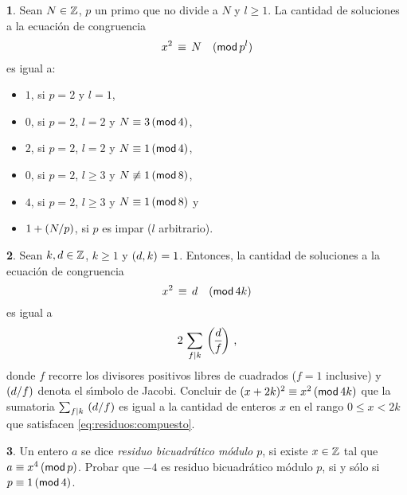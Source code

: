 \theoremstyle{definition}
\newtheorem{ejerResiduos}{\ejername}[section]


\begin{ejerResiduos}\label{ejer:residuos:potencia}
	Sean $N\in\Enteros$, $p$ un primo que no divide a $N$ y $l\geq 1$.
	La cantidad de soluciones a la ecuaci\'on de congruencia
	\begin{equation}
		\label{eq:ejer:residuos:potencia}
		x^2\,\equiv\,N\modulo[p^l]
	\end{equation}
	es igual a:
	\begin{itemize}
		\item $1$, si $p=2$ y $l=1$,
		\item $0$, si $p=2$, $l=2$ y $N\equiv 3\tmodulo[4]$,
		\item $2$, si $p=2$, $l=2$ y $N\equiv 1\tmodulo[4]$,
		\item $0$, si $p=2$, $l\geq 3$ y $N\not\equiv 1\tmodulo[8]$,
		\item $4$, si $p=2$, $l\geq 3$ y $N\equiv 1\tmodulo[8]$ y
		\item $1+\tlegendre N{p}$, si $p$ es impar ($l$ arbitrario).
	\end{itemize}
\end{ejerResiduos}

\begin{ejerResiduos}\label{ejer:residuos:compuesto}
	Sean $k,d\in\Enteros$, $k\geq 1$ y $\mcd{d,k}=1$. Entonces, la
	cantidad de soluciones a la ecuaci\'on de congruencia
	\begin{equation}
		\label{eq:residuos:compuesto}
		x^2\,\equiv\,d\modulo[4k]
	\end{equation}
	es igual a
	\begin{displaymath}
		2\,\sum_{f\mid k}\,\jacobi d{f}
		\text{ ,}
	\end{displaymath}
	donde $f$ recorre los divisores positivos libres de cuadrados
	($f=1$ inclusive) y $\tjacobi d{f}$ denota el s\'{\i}mbolo de
	Jacobi. Concluir de $(x+2k)^2\equiv x^2\tmodulo[4k]$ que la sumatoria
	$\sum_{f\mid k}\,\tjacobi d{f}$ es igual a la cantidad de enteros $x$
	en el rango $0\leq x<2k$ que satisfacen \eqref{eq:residuos:compuesto}.
\end{ejerResiduos}

\begin{ejerResiduos}
	Un entero $a$ se dice \emph{residuo bicuadr\'atico m\'odulo $p$},
	si existe $x\in\Enteros$ tal que $a\equiv x^4\tmodulo[p]$. Probar
	que $-4$ es residuo bicuadr\'atico m\'odulo $p$, si y s\'olo si
	$p\equiv 1\tmodulo[4]$.%
\end{ejerResiduos}

